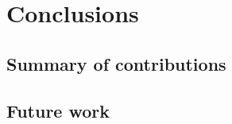 
\let\textcircled=\pgftextcircled
\chapter{Conclusions} \label{chapter:conclusions}

\section{Summary of contributions}

\section{Future work}

